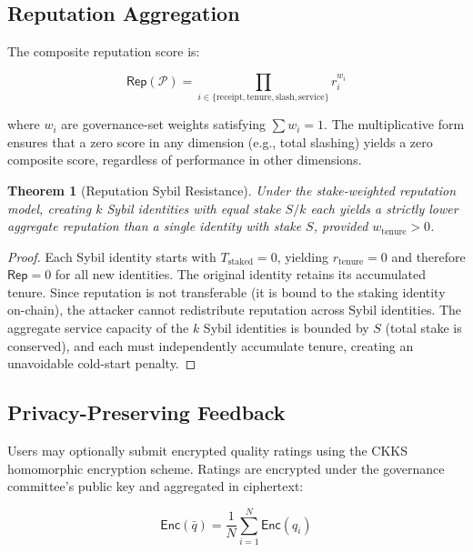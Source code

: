 \documentclass[11pt,a4paper]{article}
\newtheorem{theorem}{Theorem}
\begin{document}
\subsection{Reputation Aggregation}

The composite reputation score is:

\begin{equation}\label{eq:reputation}
    \mathsf{Rep}(\mathcal{P}) = \prod_{i \in \{\text{receipt}, \text{tenure}, \text{slash}, \text{service}\}} r_i^{w_i}
\end{equation}

where $w_i$ are governance-set weights satisfying $\sum w_i = 1$. The
multiplicative form ensures that a zero score in any dimension (e.g.,
total slashing) yields a zero composite score, regardless of performance
in other dimensions.

\begin{theorem}[Reputation Sybil Resistance]
Under the stake-weighted reputation model, creating $k$ Sybil identities
with equal stake $S/k$ each yields a strictly lower aggregate reputation
than a single identity with stake $S$, provided $w_{\text{tenure}} > 0$.
\end{theorem}

\begin{proof}
Each Sybil identity starts with $T_{\text{staked}} = 0$, yielding
$r_{\text{tenure}} = 0$ and therefore $\mathsf{Rep} = 0$ for all new
identities. The original identity retains its accumulated tenure. Since
reputation is not transferable (it is bound to the staking identity on-chain),
the attacker cannot redistribute reputation across Sybil identities. The
aggregate service capacity of the $k$ Sybil identities is bounded by $S$
(total stake is conserved), and each must independently accumulate tenure,
creating an unavoidable cold-start penalty.
\end{proof}

\subsection{Privacy-Preserving Feedback}

Users may optionally submit encrypted quality ratings using the CKKS
homomorphic encryption scheme. Ratings are encrypted under the governance
committee's public key and aggregated in ciphertext:

\begin{equation}
    \mathsf{Enc}(\bar{q}) = \frac{1}{N} \sum_{i=1}^{N} \mathsf{Enc}(q_i)
\end{equation}
\end{document}
